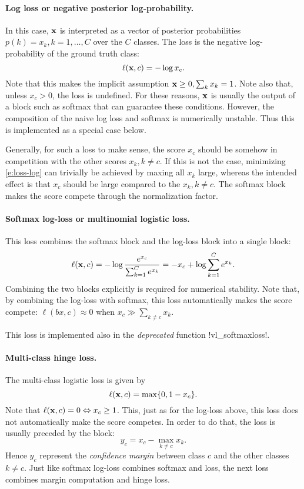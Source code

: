 \paragraph{Log loss or negative posterior log-probability.} In this case, $\mathbf{x}$ is interpreted as a vector of posterior probabilities $p(k) = x_k, k=1,\dots, C$ over the $C$ classes. The loss is the negative log-probability of the ground truth class:
\begin{equation}\label{e:loss-log}
	\ell(\mathbf{x}, c) = - \log x_c.
\end{equation}
Note that this makes the implicit assumption $\mathbf{x} \geq 0, \sum_k x_k = 1$. Note also that, unless $x_c > 0$, the loss is undefined. For these reasons, $\mathbf{x}$ is usually the output of a block such as softmax that can guarantee these conditions. However, the composition of the naive log loss and softmax is numerically unstable. Thus this is implemented as a special case below.

Generally, for such a loss to make sense, the score $x_c$ should be somehow in competition with the other scores $x_k, k\not = c$. If this is not the case, minimizing \eqref{e:loss-log} can trivially be achieved by maxing all $x_k$ large, whereas the intended effect is that $x_c$ should be large compared to the $x_k, k\not=c$. The softmax block makes the score compete through the normalization factor.

\paragraph{Softmax log-loss or multinomial logistic loss.} This loss combines the softmax block and the log-loss block into a single block:
\begin{equation}\label{e:loss-softmaxlog}
	\ell(\mathbf{x}, c) = - \log \frac{e^{x_c}}{\sum_{k=1}^C e^{x_k}}
	= - x_c + \log \sum_{k=1}^C e^{x_k}.
\end{equation}
Combining the two blocks explicitly is required for numerical stability. Note that, by combining the log-loss with softmax, this loss automatically makes the score compete: $\ell(bx,c) \approx 0$ when $x_c \gg \sum_{k\not= c} x_k$.

This loss is implemented also in the \emph{deprecated} function !vl_softmaxloss!.

\paragraph{Multi-class hinge loss.} The multi-class logistic loss is given by
\begin{equation}\label{e:loss-multiclasshinge}
	\ell(\mathbf{x}, c) = \max\{0, 1 - x_c \}.
\end{equation}
Note that $\ell(\mathbf{x},c) =0 \Leftrightarrow x_c \geq 1$. This, just as for the log-loss above, this loss does not automatically make the score competes. In order to do that, the loss is usually preceded by the block:
\[
 y_c = x_c - \max_{k \not= c} x_k.
\]
Hence $y_c$ represent the \emph{confidence margin} between class $c$ and the other classes $k \not= c$. Just like softmax log-loss combines softmax and loss, the next loss combines margin computation and hinge loss.

